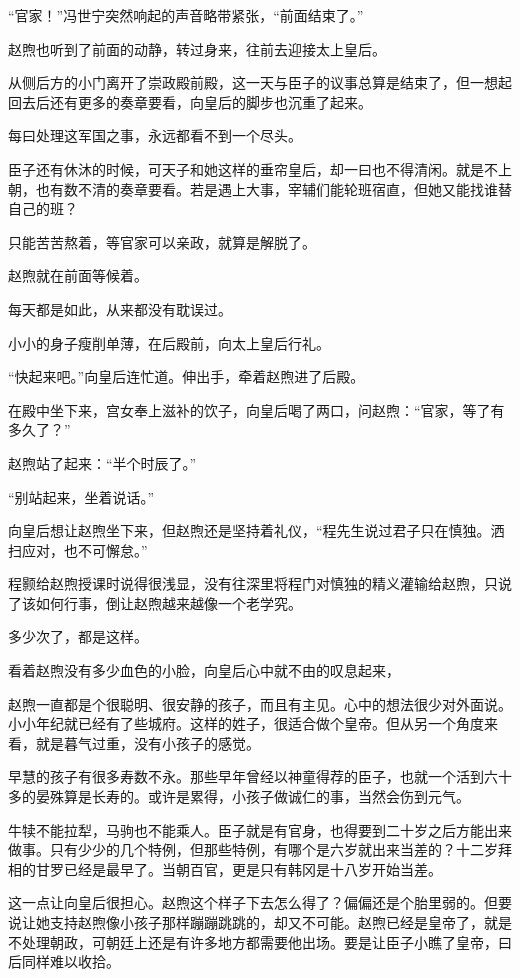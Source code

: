 “官家！”冯世宁突然响起的声音略带紧张，“前面结束了。”

赵煦也听到了前面的动静，转过身来，往前去迎接太上皇后。

从侧后方的小门离开了崇政殿前殿，这一天与臣子的议事总算是结束了，但一想起回去后还有更多的奏章要看，向皇后的脚步也沉重了起来。

每曰处理这军国之事，永远都看不到一个尽头。

臣子还有休沐的时候，可天子和她这样的垂帘皇后，却一曰也不得清闲。就是不上朝，也有数不清的奏章要看。若是遇上大事，宰辅们能轮班宿直，但她又能找谁替自己的班？

只能苦苦熬着，等官家可以亲政，就算是解脱了。

赵煦就在前面等候着。

每天都是如此，从来都没有耽误过。

小小的身子瘦削单薄，在后殿前，向太上皇后行礼。

“快起来吧。”向皇后连忙道。伸出手，牵着赵煦进了后殿。

在殿中坐下来，宫女奉上滋补的饮子，向皇后喝了两口，问赵煦：“官家，等了有多久了？”

赵煦站了起来：“半个时辰了。”

“别站起来，坐着说话。”

向皇后想让赵煦坐下来，但赵煦还是坚持着礼仪，“程先生说过君子只在慎独。洒扫应对，也不可懈怠。”

程颢给赵煦授课时说得很浅显，没有往深里将程门对慎独的精义灌输给赵煦，只说了该如何行事，倒让赵煦越来越像一个老学究。

多少次了，都是这样。

看着赵煦没有多少血色的小脸，向皇后心中就不由的叹息起来，

赵煦一直都是个很聪明、很安静的孩子，而且有主见。心中的想法很少对外面说。小小年纪就已经有了些城府。这样的姓子，很适合做个皇帝。但从另一个角度来看，就是暮气过重，没有小孩子的感觉。

早慧的孩子有很多寿数不永。那些早年曾经以神童得荐的臣子，也就一个活到六十多的晏殊算是长寿的。或许是累得，小孩子做诚仁的事，当然会伤到元气。

牛犊不能拉犁，马驹也不能乘人。臣子就是有官身，也得要到二十岁之后方能出来做事。只有少少的几个特例，但那些特例，有哪个是六岁就出来当差的？十二岁拜相的甘罗已经是最早了。当朝百官，更是只有韩冈是十八岁开始当差。

这一点让向皇后很担心。赵煦这个样子下去怎么得了？偏偏还是个胎里弱的。但要说让她支持赵煦像小孩子那样蹦蹦跳跳的，却又不可能。赵煦已经是皇帝了，就是不处理朝政，可朝廷上还是有许多地方都需要他出场。要是让臣子小瞧了皇帝，曰后同样难以收拾。

